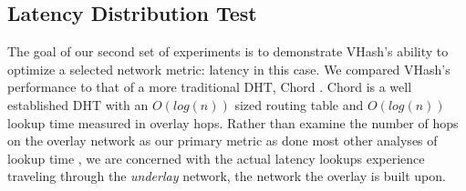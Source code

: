 \documentclass{IEEEtran}
\begin{document}






\subsection{Latency Distribution Test}
The goal of our second set of experiments is to demonstrate VHash's ability to optimize a selected network metric: latency in this case.  
We compared VHash's performance to that of a more traditional DHT, Chord \cite{chord}.
Chord is a well established DHT with an $O(log(n))$ sized routing table and $O(log(n))$ lookup time measured in overlay hops.  
Rather than examine the number of hops on the overlay network as our primary metric as done most other analyses of lookup time \cite{chord} \cite{pastry} \cite{raynet}  \cite{kademlia} \cite{voronet}, we are concerned with the actual latency lookups experience traveling through the \emph{underlay} network, the network the overlay is built upon.
\end{document}
